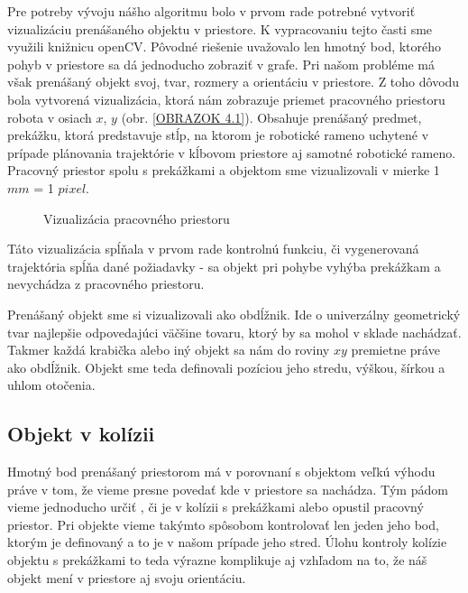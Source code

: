 Pre potreby vývoju nášho algoritmu bolo v prvom rade potrebné vytvoriť vizualizáciu prenášaného objektu v priestore. K vypracovaniu tejto časti sme využili knižnicu openCV. Pôvodné riešenie uvažovalo len hmotný bod, ktorého pohyb v priestore sa dá jednoducho zobraziť v grafe. Pri našom probléme má však prenášaný objekt svoj, tvar, rozmery a orientáciu v priestore. Z toho dôvodu bola vytvorená vizualizácia, ktorá nám zobrazuje priemet pracovného priestoru robota v osiach $ x $, $ y $ (obr. \ref{OBRAZOK 4.1}). Obsahuje prenášaný predmet, prekážku, ktorá predstavuje stĺp, na ktorom je robotické rameno uchytené  v prípade plánovania trajektórie v kĺbovom priestore aj samotné robotické rameno. Pracovný priestor spolu s prekážkami a objektom sme vizualizovali v mierke  1 $mm$ = 1 $pixel$. 

\begin{figure}[h]
	\centering
	\caption{Vizualizácia pracovného priestoru} \label{OBRAZOK 4.1} 
	\label{fig:border}
\end{figure} 

Táto vizualizácia spĺňala v prvom rade kontrolnú funkciu, či vygenerovaná trajektória spĺňa dané požiadavky - sa objekt pri pohybe vyhýba prekážkam a nevychádza z pracovného priestoru.

Prenášaný objekt sme si vizualizovali ako obdĺžnik. Ide o univerzálny geometrický tvar najlepšie odpovedajúci  väčšine tovaru, ktorý by sa mohol v sklade nachádzať. Takmer každá krabička alebo iný objekt sa nám do roviny $ xy $ premietne práve ako obdĺžnik. Objekt sme teda definovali pozíciou jeho stredu, výškou, šírkou a uhlom otočenia. 

\subsection{Objekt v kolízii}
Hmotný bod prenášaný priestorom má v porovnaní s objektom veľkú výhodu práve v tom, že vieme presne povedať kde v priestore sa nachádza. Tým pádom vieme jednoducho určiť , či je v kolízii s prekážkami alebo opustil pracovný priestor. Pri objekte vieme takýmto spôsobom kontrolovať len jeden jeho bod, ktorým je definovaný a to je v našom prípade jeho stred. Úlohu kontroly kolízie objektu s prekážkami to teda výrazne komplikuje aj vzhľadom na to, že náš objekt mení v priestore aj svoju orientáciu. 

